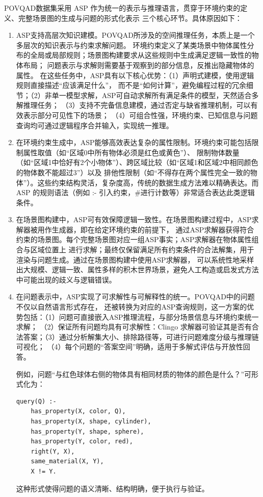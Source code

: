 POVQAD数据集采用 ASP 作为统一的表示与推理语言，贯穿于环境约束的定义、完整场景图的生成与问题的形式化表示
三个核心环节。具体原因如下：
\begin{enumerate}[itemsep=0pt,parsep=0pt]
\item ASP支持高层次知识建模。POVQAD所涉及的空间推理任务，本质上是一个多层次的知识表示与约束求解问题。
环境约束定义了某类场景中物体属性分布的全局或局部规则；场景图构建要求从这些规则中生成满足逻辑一致性的物体布局；
问题表示与求解则需要基于观察到的部分信息，反推出隐藏物体的属性。
在这些任务中，ASP具有以下核心优势：（1）声明式建模，使用逻辑规则直接描述“应该满足什么”，
而不是“如何计算”，避免编程过程的冗余细节；（2）非单一模型求解，ASP可自动求解所有满足条件的模型，天然适合多解推理任务；
（3）支持不完备信息建模，通过否定与缺省推理机制，可以有效表示部分可见性下的场景；
（4）可组合性强，环境约束、已知信息与问题查询均可通过逻辑程序合并输入，实现统一推理。
\item 在环境约束生成中，ASP能够高效表达复杂的属性限制。环境约束可能包括限制属性取值（如“区域0中所有物体必须是红色或黄色”）、
限制物体数量（如“区域1中恰好有2个小物体”）、跨区域比较（如“区域1和区域2中相同颜色的物体数不能超过3”）以及
排他性限制（如“不得存在两个属性完全一致的物体”）。这些约束结构灵活，复杂度高，传统的数据生成方法难以精确表达。而 ASP 的规则语法（例如 :- 引入约束，\#进行计数等）非常适合表达此类逻辑条件。
\item 在场景图构建中，ASP可有效保障逻辑一致性。在场景图构建过程中，ASP求解器被用作生成器，即在给定环境约束的前提下，
通过ASP求解器获得符合约束的场景图。每个完整场景图对应一组ASP事实；ASP求解器在物体属性组合与区域位置上
进行求解；最终仅保留满足所有约束条件的合法解集，用于渲染与问题生成。通过在场景图构建中使用ASP求解器，
可以系统性地采样出大规模、逻辑一致、属性多样的积木世界场景，避免人工构造或启发式方法中可能出现的歧义与逻辑错误。
\item 在问题表示中，ASP实现了可求解性与可解释性的统一。POVQAD中的问题不仅以自然语言形式存在，
还被转换为对应的ASP查询规则，这一方案的优势包括：（1）问题可直接嵌入ASP推理流程，与部分场景信息与环境约束统一求解；
（2）保证所有问题均具有可求解性：Clingo 求解器可验证其是否有合法答案；（3）通过分析解集大小、排除路径等，可进行问题难度分级与推理链可视化；
（4）每个问题的“答案空间”明确，适用于多解式评估与开放性回答。

例如，问题“与红色球体右侧的物体具有相同材质的物体的颜色是什么？”可形式化为：
\begin{lstlisting}
query(Q) :-
    has_property(X, color, Q),
    has_property(X, shape, cylinder),
    has_property(Y, shape, sphere),
    has_property(Y, color, red),
    right(Y, X),
    same_material(X, Y),
    X != Y.
\end{lstlisting}

这种形式使得问题的语义清晰、结构明确，便于执行与验证。
\end{enumerate}

